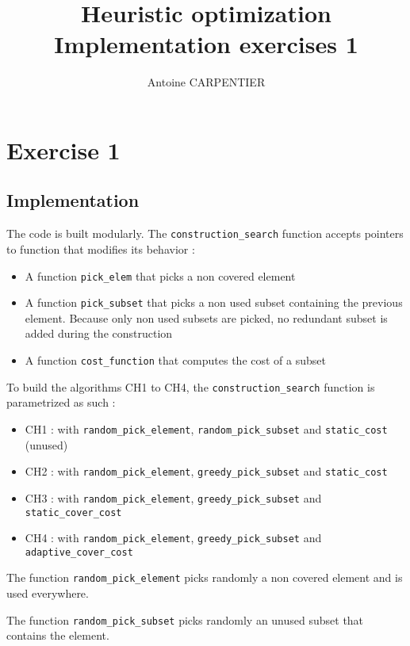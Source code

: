 \documentclass[a4paper,12pt]{article}
\author{Antoine CARPENTIER}
\title{Heuristic optimization\\ \small Implementation exercises 1}
\begin{document}
\maketitle

\section{Exercise 1}

\subsection{Implementation}

The code is built modularly. The \texttt{construction\_search} function accepts pointers to function that modifies its behavior : 

\begin{itemize}
    \item A function \texttt{pick\_elem} that picks a non covered element
    \item A function \texttt{pick\_subset} that picks a non used subset containing the previous element. Because only non used subsets are picked, no redundant subset is added during the construction
    \item A function \texttt{cost\_function} that computes the cost of a subset
\end{itemize}

To build the algorithms CH1 to CH4, the \texttt{construction\_search} function is parametrized as such : 

\begin{itemize}
    \item CH1 : with \texttt{random\_pick\_element}, \texttt{random\_pick\_subset} and \texttt{static\_cost} (unused)
    \item CH2 : with \texttt{random\_pick\_element}, \texttt{greedy\_pick\_subset} and \texttt{static\_cost}
    \item CH3 : with \texttt{random\_pick\_element}, \texttt{greedy\_pick\_subset} and \texttt{static\_cover\_cost}
    \item CH4 : with \texttt{random\_pick\_element}, \texttt{greedy\_pick\_subset} and \texttt{adaptive\_cover\_cost}
\end{itemize}

The function \texttt{random\_pick\_element} picks randomly a non covered element and is used everywhere.

The function \texttt{random\_pick\_subset} picks randomly an unused subset that contains the element.
\end{document}
